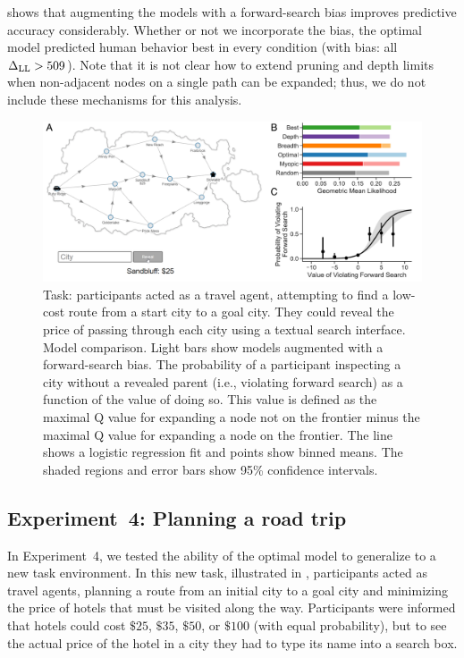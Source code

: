  shows that augmenting the models with a forward-search bias improves predictive accuracy considerably. Whether or not we incorporate the bias, the optimal model predicted human behavior best in every condition (with bias: all $\Delta_{\mathrm{LL}} > 509$). Note that it is not clear how to extend pruning and depth limits when non-adjacent nodes on a single path can be expanded; thus, we do not include these mechanisms for this analysis.


\begin{figure}[t!]
  \centering
  \includegraphics[width=\textwidth]{figs/planning/fig6.pdf}
  \caption{ 
     Task: participants acted as a travel agent, attempting to find a low-cost route from a start city to a goal city. They could reveal the price of passing through each city using a textual search interface.
     Model comparison. Light bars show models augmented with a forward-search bias.
     The probability of a participant inspecting a city without a revealed parent (i.e., violating forward search) as a function of the value of doing so. This value is defined as the maximal Q value for expanding a node not on the frontier minus the maximal Q value for expanding a node on the frontier. The line shows a logistic regression fit and points show binned means. The shaded regions and error bars show 95\% confidence intervals.
  }
  \label{fig:planning-exp4}
\end{figure}


\subsection{Experiment~4: Planning a road trip}\label{sec:planning-results4}

In Experiment~4, we tested the ability of the optimal model to generalize to a new task environment. In this new task, illustrated in , participants acted as travel agents, planning a route from an initial city to a goal city and minimizing the price of hotels that must be visited along the way. Participants were informed that hotels could cost $\$25$, $\$35$, $\$50$, or $\$100$ (with equal probability), but to see the actual price of the hotel in a city they had to type its name into a search box.

